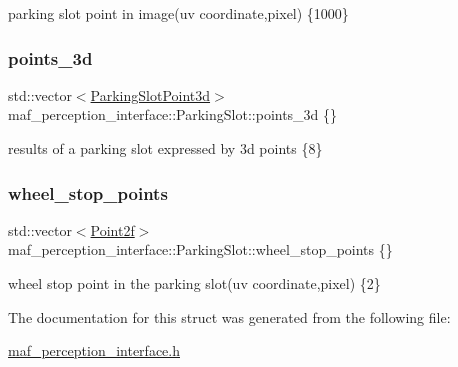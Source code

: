 parking slot point in image(uv coordinate,pixel) \{1000\} 

\mbox{\label{structmaf__perception__interface_1_1ParkingSlot_a1883232973850dd00a3143c4923947a5}} 
\subsubsection{\texorpdfstring{points\+\_\+3d}{points\_3d}}
{\footnotesize\ttfamily std\+::vector$<$\hyperlink{structmaf__perception__interface_1_1ParkingSlotPoint3d}{Parking\+Slot\+Point3d}$>$ maf\+\_\+perception\+\_\+interface\+::\+Parking\+Slot\+::points\+\_\+3d \{\}}

results of a parking slot expressed by 3d points \{8\} \mbox{\label{structmaf__perception__interface_1_1ParkingSlot_af687d18557685e3b6b3bad2ab1551a19}} 
\subsubsection{\texorpdfstring{wheel\+\_\+stop\+\_\+points}{wheel\_stop\_points}}
{\footnotesize\ttfamily std\+::vector$<$\hyperlink{structmaf__perception__interface_1_1Point2f}{Point2f}$>$ maf\+\_\+perception\+\_\+interface\+::\+Parking\+Slot\+::wheel\+\_\+stop\+\_\+points \{\}}



wheel stop point in the parking slot(uv coordinate,pixel) \{2\} 



The documentation for this struct was generated from the following file\+:\begin{DoxyCompactItemize}
\item 
\hyperlink{maf__perception__interface_8h}{maf\+\_\+perception\+\_\+interface.\+h}\end{DoxyCompactItemize}
